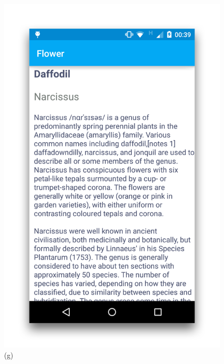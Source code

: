 \documentclass[11pt, a4paper]{report}
\begin{document}
\begin{figure}[h]
\begin{minipage}[b]{0.2\linewidth}
	\includegraphics[totalheight=6cm]{img/45.png}
	(g)
\end{minipage}
\begin{minipage}[b]{0.2\linewidth}
	\centering

\end{minipage}
\end{figure}
\end{document}
